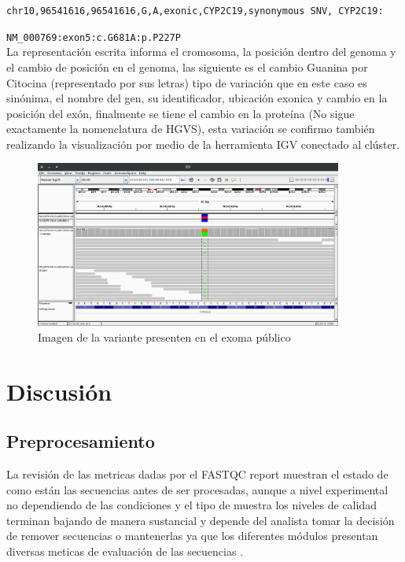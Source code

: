 \texttt{chr10,96541616,96541616,G,A,exonic,CYP2C19,synonymous SNV, CYP2C19:}

\texttt{NM\_000769:exon5:c.G681A:p.P227P} \\

La representación escrita informa el cromosoma, la posición dentro del genoma y el cambio de posición en el genoma, las siguiente es el cambio Guanina por Citocina (representado por sus letras) tipo de variación que en este caso es sinónima, el nombre del gen, su identificador, ubicación exonica y cambio en la posición del exón, finalmente se tiene el cambio en la proteína (No sigue exactamente la nomenclatura de HGVS), esta variación se confirmo también realizando la visualización por medio de la herramienta IGV conectado al clúster.

\begin{figure}[H]
	\centering
	\includegraphics[width=0.9\textwidth]{Kap2/IGV}
	\caption{Imagen de la variante presenten en el exoma público} \label{fig:igv}
\end{figure}
\section{Discusión}

\subsection{Preprocesamiento}

La revisión de las metricas dadas por el FASTQC report muestran el estado de como están las secuencias antes de ser procesadas, aunque a nivel experimental no dependiendo de las condiciones y el tipo de muestra los niveles de calidad terminan bajando de manera sustancial y depende del analista tomar la decisión de remover secuencias o mantenerlas ya que los diferentes módulos presentan diversas meticas de evaluación de las secuencias \cite{Babraham2016}. \\

